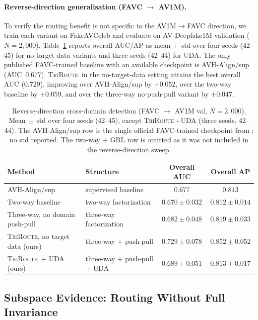 \documentclass{article}
\newcommand{\method}{\textsc{TriRoute}}
\begin{document}
\paragraph{Reverse-direction generalisation (FAVC $\to$ AV1M).}
To verify the routing benefit is not specific to the AV1M$\to$FAVC direction, we train each variant on FakeAVCeleb and evaluate on AV-Deepfake1M validation ($N=2{,}000$). Table~\ref{tab:reverse} reports overall AUC/AP as mean$\,\pm\,$std over four seeds (42--45) for no-target-data variants and three seeds (42--44) for UDA. The only published FAVC-trained baseline with an available checkpoint is AVH-Align/sup \citep{smeu2025avhalign} (AUC~$0.677$). \method\ in the no-target-data setting attains the best overall AUC ($0.729$), improving over AVH-Align/sup by $+0.052$, over the two-way baseline by $+0.059$, and over the three-way no-push-pull variant by $+0.047$.

\begin{table}[t]
    \centering
    \caption{Reverse-direction cross-domain detection (FAVC $\to$ AV1M val, $N=2{,}000$). Mean$\,\pm\,$std over four seeds (42--45), except \method\,+UDA (three seeds, 42--44). The AVH-Align/sup row is the single official FAVC-trained checkpoint from \citet{smeu2025avhalign}; no std reported. The two-way + GRL row is omitted as it was not included in the reverse-direction sweep.}
    \label{tab:reverse}
    \small
    \begin{tabular}{llcc}
        \toprule
        Method & Structure & Overall AUC & Overall AP \\
        \midrule
        AVH-Align/sup \citep{smeu2025avhalign} & supervised baseline & $0.677$ & $0.813$ \\
        \midrule
        Two-way baseline                 & two-way factorization        & $0.670 \pm 0.032$ & $0.812 \pm 0.014$ \\
        Three-way, no domain push-pull   & three-way factorization      & $0.682 \pm 0.048$ & $0.819 \pm 0.033$ \\
        \method, no target data (ours)   & three-way + push-pull        & $\mathbf{0.729 \pm 0.078}$ & $\mathbf{0.852 \pm 0.052}$ \\
        \method\ + UDA (ours)            & three-way + push-pull + UDA  & $0.689 \pm 0.051$ & $0.813 \pm 0.017$ \\
        \bottomrule
    \end{tabular}
\end{table}

\subsection{Subspace Evidence: Routing Without Full Invariance}
\end{document}
